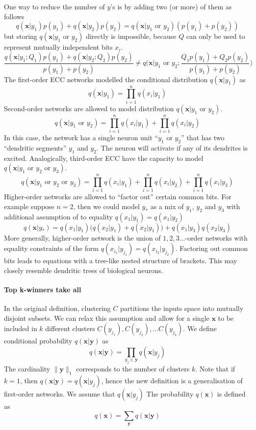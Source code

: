 \documentclass[12pt]{article}
\begin{document}
One way to reduce the number of $y$'s is by adding two (or more) of them as follows
\[
q(\boldsymbol{x}|y_1) p(y_1)+q(\boldsymbol{x}|y_2) p(y_2) = 
q(\boldsymbol{x}|y_1\text{ or }y_2) (p(y_1)+p(y_2))
\]
but storing $q(\boldsymbol{x}|y_1\text{ or }y_2)$ directly is impossible, because $Q$ can only be used to represent mutually independent bits $x_i$. 
\[
\frac{q(\boldsymbol{x}|y_1;Q_1) p(y_1)+q(\boldsymbol{x}|y_2;Q_2) p(y_2)}{p(y_1)+p(y_2)} \ne 
q\big(\boldsymbol{x}|y_1\text{ or }y_2;\frac{Q_1p(y_1) +Q_2p(y_2)}{p(y_1)+p(y_2)}\big) 
\]
The first-order ECC networks modelled the conditional distribution $q(\boldsymbol{x}|y_1)$ as
\[
q(\boldsymbol{x}|y_1) = \prod_{i=1}^{n}q(x_i|y_1)
\]
Second-order networks are allowed to model distribution $q(\boldsymbol{x}|y_1\text{ or }y_2)$. 
\[
q(\boldsymbol{x}|y_1\text{ or }y_2) = \prod_{i=1}^{n}q(x_i|y_1) + \prod_{i=1}^{n}q(x_i|y_2)
\]
In this case, the network has a single neuron unit ``$y_1\text{ or }y_2$'' that has two ``dendritic segments'' $y_1$ and $y_2$. The neuron will activate if any of its dendrites is excited. Analogically, third-order ECC have the capacity to model $q(\boldsymbol{x}|y_1\text{ or }y_2\text{ or }y_3)$. 
\[
q(\boldsymbol{x}|y_1\text{ or }y_2\text{ or }y_3) = \prod_{i=1}^{n}q(x_i|y_1) + \prod_{i=1}^{n}q(x_i|y_2) + \prod_{i=1}^{n}q(x_i|y_3)
\]
Higher-order networks are allowed to ``factor out'' certain common bits. For example suppose $n=2$, then we could model $y_*$ as a mix of $y_1$, $y_2$ and $y_3$ with additional assumption of to equality $q(x_1|y_1)=q(x_1|y_2)$
\[
q(\boldsymbol{x}|y_*) = q(x_1|y_1)\big(q(x_2|y_1) +q(x_2|y_1)\big) + q(x_1|y_3)q(x_2|y_3)
\]
More generally, higher-order network is the union of $1,2,3...$-order networks with equality constraints of the form $q(x_{i_1}|y_{j_1})=q(x_{i_2}|y_{j_2})$. Factoring out common bits leads to equations with a tree-like nested structure of brackets.
This may closely resemble dendritic trees of biological neurons.

\paragraph{Top k-winners take all}
In the original definition, clustering $C$ partitions the inputs space into mutually disjoint subsets. We can relax this assumption and allow for a single $\boldsymbol{x}$ to be included in $k$ different clusters $C(y_{j_1}),C(y_{j_2}),...C(y_{j_k})$.
We define conditional probability $q(\boldsymbol{x}|\boldsymbol{y})$ as
\[
q(\boldsymbol{x}|\boldsymbol{y}) = \prod_{y_j \in \boldsymbol{y}} q(\boldsymbol{x}|y_j)
\]
The cardinality $\lVert \boldsymbol{y} \rVert_1$ corresponds to the number of clusters $k$. Note that if $k=1$, then $q(\boldsymbol{x}|\boldsymbol{y})=q(\boldsymbol{x}|y_j)$, hence the new definition is a generalisation of first-order networks.
We assume that $q(\boldsymbol{x}|y_j)$
The probability $q(\boldsymbol{x})$ is defined as
\[
q(\boldsymbol{x}) = \sum_{\boldsymbol{y}} q(\boldsymbol{x}|\boldsymbol{y})
\]


 
    
\end{document}
